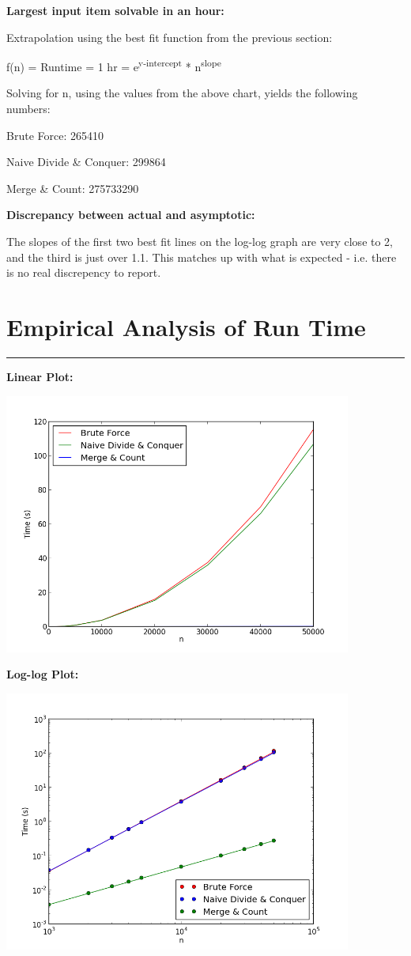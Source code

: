 \documentclass[letterpaper,10pt,titlepage,fleqn]{article}
\begin{document}
\begin{centering}
\textbf{Largest input item solvable in an hour:}
\end{centering}

Extrapolation using the best fit function from the previous section: 

f(n) = Runtime = 1 hr = e\textsuperscript{y-intercept} * n\textsuperscript{slope}

Solving for n, using the values from the above chart, yields the following numbers: 

Brute Force: 265410

Naive Divide \& Conquer: 299864

Merge \& Count: 275733290

\begin{centering}
\textbf{Discrepancy between actual and asymptotic:}
\end{centering}

The slopes of the first two best fit lines on the log-log graph are very close to 2, and the third is just over 1.1. This matches up with what is expected - i.e. there is no real discrepency to report.

\newpage

\section*{Empirical Analysis of Run Time}
\hrule
\textbf{Linear Plot:}
\vskip 0.04in
\begin{center}
\includegraphics[width=4.5in]{input_time.png}
\end{center}
\textbf{Log-log Plot:}
\vskip 0.04in
\begin{center}
\includegraphics[width=4.5in]{loglog.png}
\end{center}
\end{document}
